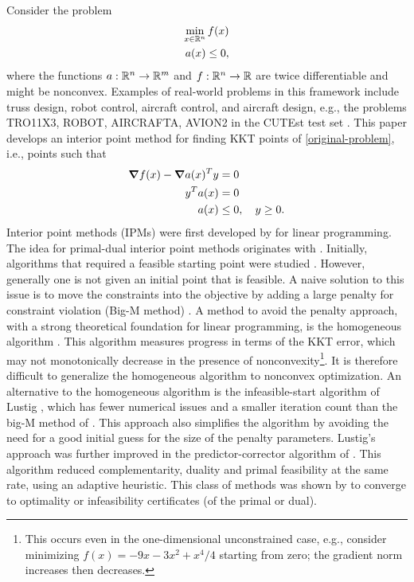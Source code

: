 \documentclass{article}
\begin{document}
Consider the problem
\begin{subequations}\label{original-problem} 
\begin{flalign}
\min_{x \in \mathbb{R}^{n}}{f(x)} \\
a(x) \le 0,
\end{flalign}
\end{subequations}
where the functions $a : \mathbb{R}^{n} \rightarrow \mathbb{R}^{m}$ and $f : \mathbb{R}^{n} \rightarrow \mathbb{R}$ are twice differentiable and might be nonconvex. Examples of real-world problems in this framework include truss design, robot control, aircraft control, and aircraft design, e.g., the problems TRO11X3, ROBOT, AIRCRAFTA, AVION2 in the CUTEst test set \cite{gould2015cutest}. This paper develops an interior point method for finding KKT points of \eqref{original-problem}, i.e., points such that
\begin{subequations}\label{kkt-of-original-problem} 
\begin{flalign}
\grad f(x) - \grad a(x)^T y &= 0 \\
y^T a(x) &= 0 \\
a(x) &\le 0, \quad y \ge 0.
\end{flalign}
\end{subequations}
Interior point methods (IPMs) were first developed by \citet*{karmarkar1984new} for linear programming. The idea for primal-dual interior point methods originates with \citet*{megiddo1989pathways}. Initially, algorithms that required a feasible starting point were studied \cite{kojima1989primal,monteiro1989interior}. However, generally one is not given an initial point that is feasible. A naive solution to this issue is to move the constraints into the objective  by adding a large penalty for constraint violation (Big-M method) \cite{mcshane1989implementation}. A method to avoid the penalty approach, with a strong theoretical foundation for linear programming, is the homogeneous algorithm \cite{andersen1998computational,andersen1999homogeneous,ye1994nl}. This algorithm measures progress in terms of the KKT error, which may not monotonically decrease in the presence of nonconvexity\footnote{This occurs even in the one-dimensional unconstrained case, e.g., consider minimizing $f(x)=-9 x - 3 x^2 + x^4/4$ starting from zero; the gradient norm increases then decreases.}. It is therefore difficult to generalize the homogeneous algorithm to nonconvex optimization. An alternative to the homogeneous algorithm is the infeasible-start algorithm of Lustig \cite{lustig1990feasibility}, which has fewer numerical issues and a smaller iteration count than the big-M method of \cite{mcshane1989implementation}. This approach also simplifies the algorithm by avoiding the need for a good initial guess for the size of the penalty parameters. Lustig's approach was further improved in the predictor-corrector algorithm of \citet*{mehrotra1992implementation}. This algorithm reduced complementarity, duality and primal feasibility at the same rate, using an adaptive heuristic. This class of methods was shown by \citet*{todd2003detecting} to converge to optimality or infeasibility certificates (of the primal or dual). 
\end{document}
